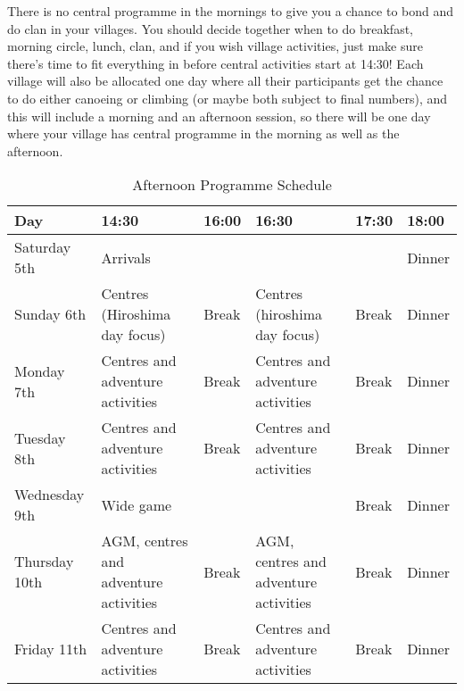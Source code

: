 \documentclass[a4paper, 11pt]{report}
\begin{document}
There is no central programme in the mornings to give you a chance to bond and do clan in your villages. You should decide together when to do breakfast, morning circle, lunch, clan, and if you wish village activities, just make sure there's time to fit everything in before central activities start at 14:30! Each village will also be allocated one day where all their participants get the chance to do either canoeing or climbing (or maybe both subject to final numbers), and this will include a morning and an afternoon session, so there will be one day where your village has central programme in the morning as well as the afternoon.
\begin{table}[H]
    \centering
    {\RaggedRight
    \begin{tabular}{p{} p{} p{} p{} p{} p{}}
        \textbf{Day} & \textbf{14:30} & \textbf{16:00} & \textbf{16:30} & \textbf{17:30} & \textbf{18:00} \\
        \hline
        Saturday 5th & \multicolumn{4}{l}{Arrivals} & Dinner \\
        \hline
        Sunday 6th & \cellcolor{wcfGreen}Centres (Hiroshima day focus) & Break & \cellcolor{wcfGreen}Centres (hiroshima day focus) & Break & Dinner \\
        \hline
        Monday 7th & \cellcolor{wcfGreen}Centres and adventure activities & Break & \cellcolor{wcfGreen}Centres and adventure activities & Break & Dinner \\
        \hline
        Tuesday 8th & \cellcolor{wcfYellow}Centres and adventure activities & Break & \cellcolor{wcfYellow}Centres and adventure activities & Break & Dinner \\
        \hline
        Wednesday 9th & \multicolumn{3}{l}{\cellcolor{wcfYellow}Wide game} & Break & Dinner \\
        \hline
        Thursday 10th & \cellcolor{wcfRed}AGM, centres and adventure activities & Break & \cellcolor{wcfRed}AGM, centres and adventure activities & Break & Dinner \\
        \hline 
        Friday 11th & \cellcolor{wcfRed}Centres and adventure activities & Break & \cellcolor{wcfRed}Centres and adventure activities & Break & Dinner\\
        \hline
    \end{tabular}
    }%
    \caption{Afternoon Programme Schedule}
\end{table}
\end{document}
